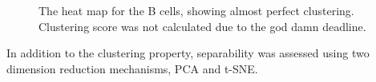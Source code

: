 \documentclass[3p,authoryear,preprint,12pt]{elsarticle}
\makeatletter
\def\fixFloatSize#1{}%
\makeatother
\begin{document}
\egroup
\bgroup
\fixFloatSize{img/BHeatmap.png}
\begin{figure}[!htbp]
	\centering \makeatletter{}
	\makeatother 
	\caption{{The heat map for the B cells, showing almost perfect clustering. Clustering score was not calculated due to the god damn deadline.}}
	\label{f-c2b15a1baca9}
\end{figure}
\egroup

In addition to the clustering property, separability was assessed using two dimension reduction mechanisms, PCA and t-SNE.
\end{document}
